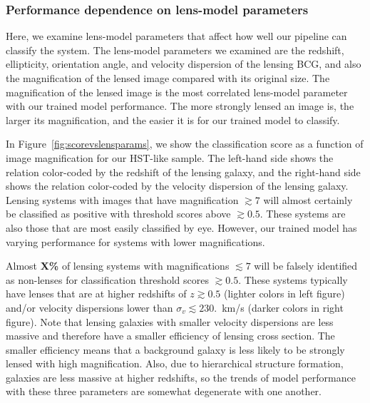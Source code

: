 \documentclass{emulateapj}
\newcommand{\todo}[1]{{\bf\color{blue} #1}}
\def\gsim{\gtrsim}
\def\lsim{\lesssim}
\begin{document}
\subsubsection{Performance dependence on lens-model parameters}
\label{sec:peformance_lensmodel}

Here, we examine lens-model parameters that affect how well our
pipeline can classify the system.  The lens-model parameters we
examined are the redshift, ellipticity, orientation angle, and
velocity dispersion of the lensing BCG, and also the magnification of
the lensed image compared with its original size.  The magnification
of the lensed image is the most correlated lens-model parameter with
our trained model performance.  The more strongly lensed an image is,
the larger its magnification, and the easier it is for our trained
model to classify.

In Figure~\ref{fig:scorevslensparams}, we show the classification
score as a function of image magnification for our HST-like sample.
The left-hand side shows the relation color-coded by the redshift of
the lensing galaxy, and the right-hand side shows the relation
color-coded by the velocity dispersion of the lensing galaxy.  Lensing
systems with images that have magnification $\gsim7$ will almost
certainly be classified as positive with threshold scores above
$\gsim0.5$.  These systems are also those that are most easily
classified by eye.  However, our trained model has varying performance
for systems with lower magnifications.

Almost \todo{X\%} of lensing systems with magnifications $\lsim7$ will
be falsely identified as non-lenses for classification threshold
scores $\gsim0.5$.  These systems typically have lenses that are at
higher redshifts of $z\gsim0.5$ (lighter colors in left figure) and/or
velocity dispersions lower than $\sigma_v\lsim230.$~km/s (darker
colors in right figure).  Note that lensing galaxies with smaller
velocity dispersions are less massive and therefore have a smaller
efficiency of lensing cross section.  The smaller efficiency means
that a background galaxy is less likely to be strongly lensed with
high magnification.  Also, due to hierarchical structure formation,
galaxies are less massive at higher redshifts, so the trends of model
performance with these three parameters are somewhat degenerate with
one another.  
\end{document}
